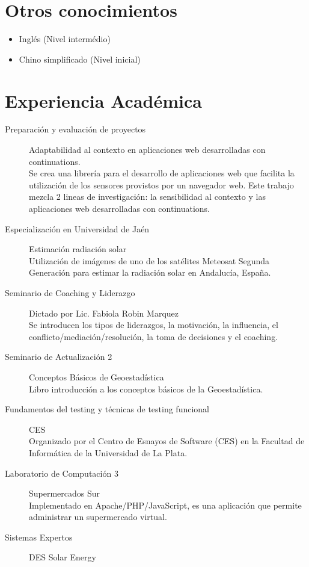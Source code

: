 \documentclass[a4paper]{article}
\begin{document}
\section{Otros conocimientos}
\begin{itemize}
\item Inglés (Nivel intermédio)
\item Chino simplificado (Nivel inicial)
\end{itemize}

\section{Experiencia Académica}
\begin{description}
\item [ Preparación y evaluación de proyectos ] Adaptabilidad al contexto en aplicaciones web desarrolladas con continuations.\\
Se crea una librería para el desarrollo de aplicaciones web que facilita la utilización de los sensores provistos por un navegador web. Este trabajo mezcla 2 lineas de investigación: la sensibilidad al contexto y las aplicaciones web desarrolladas con continuations.
\item [ Especialización en Universidad de Jaén ] Estimación radiación solar\\
Utilización de imágenes de uno de los satélites Meteosat Segunda Generación para estimar la radiación solar en Andalucía, España.
\item [ Seminario de Coaching y Liderazgo ] Dictado por Lic. Fabiola Robin Marquez\\
Se introducen los tipos de liderazgos, la motivación, la influencia, el conflicto/mediación/resolución, la toma de decisiones y el coaching.
\item [ Seminario de Actualización 2 ] Conceptos Básicos de Geoestadística\\
Libro introducción a los conceptos básicos de la Geoestadística.
\item [ Fundamentos del testing y técnicas de testing funcional ] CES\\
Organizado por el Centro de Esnayos de Software (CES) en la Facultad de Informática de la Universidad de La Plata.
\item [ Laboratorio de Computación 3 ] Supermercados Sur\\
Implementado en Apache/PHP/JavaScript, es una aplicación que permite administrar un supermercado virtual.
\item [ Sistemas Expertos ] DES Solar Energy\\

\end{description}
\end{document}
